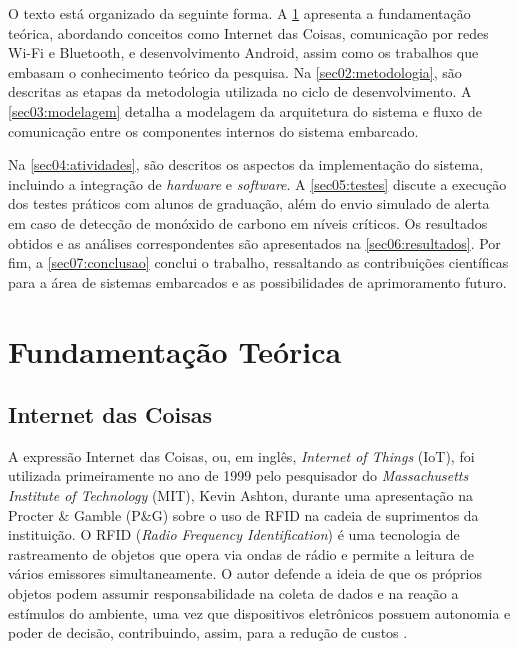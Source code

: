 \documentclass[alpha-refs,brazilian]{RBCA_v3.0}
\begin{document}
O texto está organizado da seguinte forma. A \cref{sec01:fundamentacao-teorica} apresenta a fundamentação teórica, abordando conceitos como Internet das Coisas, comunicação por redes Wi-Fi e Bluetooth, 
e desenvolvimento Android, assim como os trabalhos que embasam o conhecimento teórico da pesquisa. Na \cref{sec02:metodologia}, são descritas as etapas da metodologia utilizada no ciclo de desenvolvimento. A \cref{sec03:modelagem} detalha 
a modelagem da arquitetura do sistema e fluxo de comunicação entre os componentes internos do sistema embarcado. 

Na \cref{sec04:atividades}, são descritos os aspectos da implementação do sistema, incluindo a integração de \textit{hardware} 
e \textit{software}. A \cref{sec05:testes} discute a execução dos testes práticos com alunos de graduação, além do envio simulado de alerta em caso de detecção de monóxido de carbono em níveis críticos. Os resultados 
obtidos e as análises correspondentes são apresentados na \cref{sec06:resultados}. Por fim, a \cref{sec07:conclusao} conclui o trabalho, ressaltando as contribuições 
científicas para a área de sistemas embarcados e as possibilidades de aprimoramento futuro.

\section{Fundamentação Teórica}\label{sec01:fundamentacao-teorica}

\subsection{Internet das Coisas}\label{sec01:sub1:IoT}

A expressão Internet das Coisas, ou, em inglês, \textit{Internet of Things} (IoT), foi utilizada primeiramente no ano de 1999 pelo pesquisador do \textit{Massachusetts Institute of Technology} (MIT), Kevin Ashton, durante 
uma apresentação na Procter \& Gamble (P\&G) sobre o uso de RFID na cadeia de suprimentos da instituição. O RFID (\textit{Radio Frequency Identification}) é uma tecnologia de rastreamento de objetos que opera via ondas de rádio 
e permite a leitura de vários emissores simultaneamente. O autor defende a ideia de que os próprios objetos podem assumir responsabilidade na coleta de dados e na reação a estímulos do ambiente, uma vez que dispositivos 
eletrônicos possuem autonomia e poder de decisão, contribuindo, assim, para a redução de custos \citep{iot-definition}.
\end{document}

